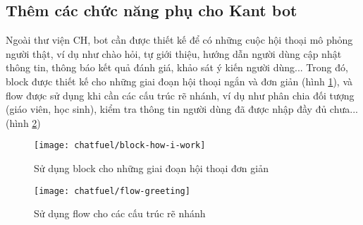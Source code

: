 \subsection{Thêm các chức năng phụ cho Kant bot}
Ngoài thư viện CH, bot cần được thiết kế để có những cuộc hội thoại mô phỏng người thật, ví dụ như chào hỏi, tự giới thiệu, hướng dẫn người dùng cập nhật thông tin, thông báo kết quả đánh giá, khảo sát ý kiến người dùng... Trong đó, block được thiết kế cho những giai đoạn hội thoại ngắn và đơn giản (hình \ref{fig:fig-c3-block-how-i-work}), và flow được sử dụng khi cần các cấu trúc rẽ nhánh, ví dụ như phân chia đối tượng (giáo viên, học sinh), kiểm tra thông tin người dùng đã được nhập đầy đủ chưa... (hình \ref{fig:fig-c3-flow-greeting})\par
\begin{figure}[htb!]\centering
	\texttt{[image: chatfuel/block-how-i-work]}
	\caption{Sử dụng block cho những giai đoạn hội thoại đơn giản}
	\label{fig:fig-c3-block-how-i-work}
\end{figure}\par

\begin{figure}[htb!]\centering
	\texttt{[image: chatfuel/flow-greeting]}
	\caption{Sử dụng flow cho các cấu trúc rẽ nhánh}
	\label{fig:fig-c3-flow-greeting}
\end{figure}\par
